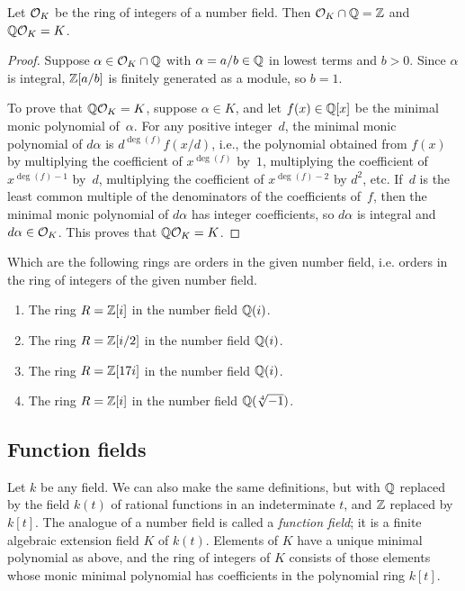 \begin{lemma}\label{lem:intq}
Let $\mathcal{O}_K$ be the ring of integers of a number field.  Then 
$\mathcal{O}_K\cap \mathbb{Q} = \mathbb{Z}$ and $\mathbb{Q}\mathcal{O}_K = K$.
\end{lemma}
\begin{proof}
  Suppose $\alpha\in \mathcal{O}_K\cap\mathbb{Q}$ with $\alpha=a/b \in \mathbb{Q}$ in lowest
  terms and $b>0$.  Since $\alpha$ is integral, $\mathbb{Z}[a/b]$ is finitely
  generated as a module, so $b=1$.

To prove that $\mathbb{Q}\mathcal{O}_K=K$, suppose $\alpha\in K$, and let
$f(x)\in\mathbb{Q}[x]$ be the minimal monic polynomial of~$\alpha$.  For any
positive integer~$d$, the minimal monic polynomial of $d\alpha$ is
$d^{\deg(f)}f(x/d)$, i.e., the polynomial obtained from $f(x)$ by
multiplying the coefficient of $x^{\deg(f)}$ by~$1$, multiplying the
coefficient of $x^{\deg(f)-1}$ by~$d$, multiplying the coefficient of
$x^{\deg(f)-2}$ by $d^2$, etc.  If~$d$ is the least common multiple of
the denominators of the coefficients of~$f$, then the minimal monic
polynomial of $d\alpha$ has integer coefficients, so $d\alpha$ is
integral and $d\alpha\in \mathcal{O}_K$.  This proves that $\mathbb{Q}\mathcal{O}_K = K$.
\end{proof}

\begin{exercise}
	Which are the following rings are orders in the given
	number field, i.e. orders in the ring of integers of the
	given number field.
	\begin{enumerate}
	\item The ring $R = \mathbb{Z}[i]$ in the number field $\mathbb{Q}(i)$.
	\item The ring $R = \mathbb{Z}[i/2]$ in the number field $\mathbb{Q}(i)$.
	\item The ring $R = \mathbb{Z}[17i]$ in the number field $\mathbb{Q}(i)$.
	\item The ring $R = \mathbb{Z}[i]$ in the number field $\mathbb{Q}(\sqrt[4]{-1})$.
	\end{enumerate}
\end{exercise}

\subsection{Function fields}
Let $k$ be any field.  We can also make the same definitions, but with $\mathbb{Q}$
replaced by the field $k(t)$ of rational functions in an indeterminate
$t$, and $\mathbb{Z}$ replaced by $k[t]$.
The analogue of a number field is called a {\em function field}; it is
a finite algebraic extension field $K$ of $k(t)$.  Elements of $K$
have a unique minimal polynomial as above, and the ring of integers of
$K$ consists of those elements whose monic minimal polynomial has
coefficients in the polynomial ring $k[t]$.  

